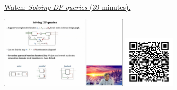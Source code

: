 
\begin{minipage}{10cm}
    \href{https://act4e-spring21.netlify.app/videos/spring2021-functorial-comp-b:solving-queries.html}{Watch: \emph{Solving DP queries} (39 minutes).}
        
    \href{https://act4e-spring21.netlify.app/videos/spring2021-functorial-comp-b:solving-queries.html}{\includegraphics[height=3.5cm]{spring2021-functorial-comp-b:solving-queries/thumbnails.jpg}}
    \href{https://act4e-spring21.netlify.app/videos/spring2021-functorial-comp-b:solving-queries.html}{\includegraphics[height=2.5cm]{spring2021-functorial-comp-b:solving-queries/qrcode.png}}
\end{minipage}
